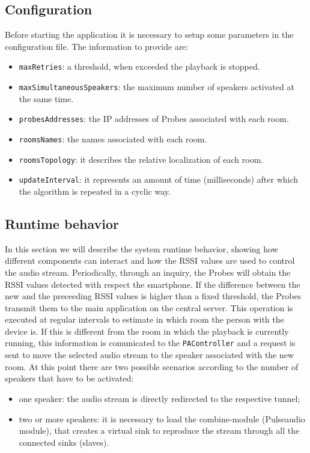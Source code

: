 \documentclass[conference]{IEEEtran}
\begin{document}
\subsection{Configuration}
Before starting the application it is necessary to setup some parameters in the configuration file. The information to provide are:
\begin{itemize}
\item \texttt{maxRetries}: a threshold, when exceeded the playback is stopped.
\item \texttt{maxSimultaneousSpeakers}: the maximum number of speakers activated at the same time.
\item \texttt{probesAddresses}: the IP addresses of Probes associated with each room.
\item \texttt{roomsNames}: the names associated with each room.
\item \texttt{roomsTopology}: it describes the relative localization of each room. %
\item \texttt{updateInterval}: it represents an amount of time (milliseconds) after which the algorithm is repeated in a cyclic way. 
\end{itemize}

\subsection{Runtime behavior}
In this section we will describe the system runtime behavior, showing how different components can interact and how the RSSI values are used to control the audio stream.
Periodically, through an inquiry, the Probes will obtain the RSSI values detected with respect the smartphone. If the difference between the new and the preceeding RSSI values is higher than a fixed threshold, the Probes transmit them to the main application on the central server. This operation is executed at regular intervals to estimate in which room the person with the device is. If this is different from the room in which the playback is currently running, this information is comunicated to the \texttt{PAController} and a request is sent to move the selected audio stream to the speaker associated with the new room. At this point there are two possible scenarios according to the number of speakers that have to be activated:
\begin{itemize}
\item one speaker: the audio stream is directly redirected to the respective tunnel;
\item two or more speakers: it is necessary to load the combine-module (Pulseaudio module), that creates a virtual sink to reproduce the stream through all the connected sinks (slaves).
\end{itemize}
\end{document}
